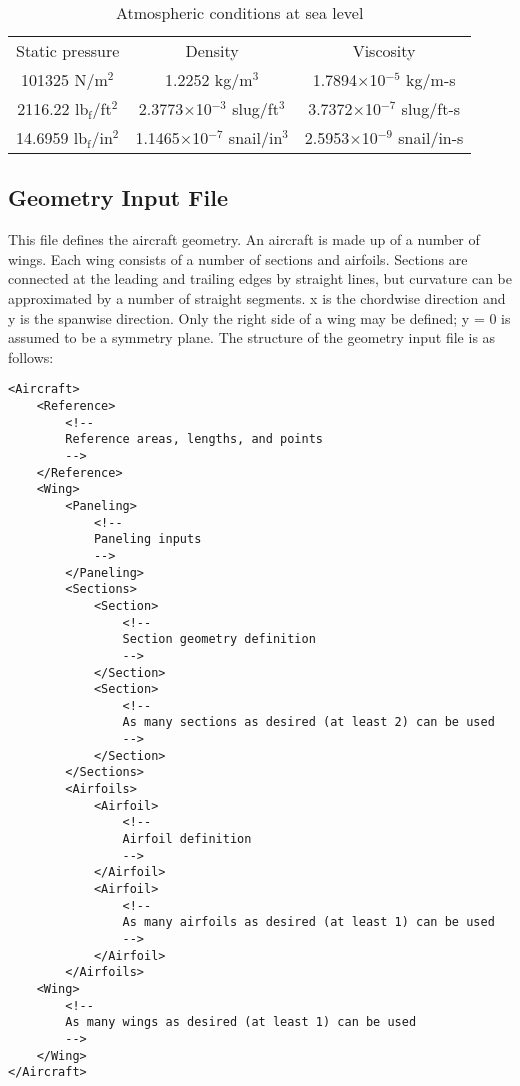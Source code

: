 \documentclass[11pt]{article}
\begin{document}
\begin{table}
\caption{Atmospheric conditions at sea level}
\centering
	\begin{tabular}{c c c} \hline \hline
	Static pressure                  & Density                          & Viscosity \\
	101325 N/m$^2$                   & 1.2252 kg/m$^3$                  & 1.7894$\times$10$^{-5}$ kg/m-s \\
	2116.22 lb$_\text{f}$/ft$^2$ & 2.3773$\times$10$^{-3}$ slug/ft$^3$  & 3.7372$\times$10$^{-7}$ slug/ft-s \\
	14.6959 lb$_\text{f}$/in$^2$ & 1.1465$\times$10$^{-7}$ snail/in$^3$ & 2.5953$\times$10$^{-9}$ snail/in-s
	\end{tabular}
\label{table:units}
\end{table}

\subsection{Geometry Input File}

This file defines the aircraft geometry. An aircraft is made up of a number of
wings. Each wing consists of a number of sections and airfoils. Sections are
connected at the leading and trailing edges by straight lines, but curvature
can be approximated by a number of straight segments. x is the chordwise
direction and y is the spanwise direction. Only the right side of a wing may
be defined; y = 0 is assumed to be a symmetry plane. The structure of the
geometry input file is as follows:
\begin{verbatim}
<Aircraft>
    <Reference>
        <!--
        Reference areas, lengths, and points
        -->
    </Reference>
    <Wing>
        <Paneling>
            <!--
            Paneling inputs
            -->
        </Paneling>
        <Sections>
            <Section>
                <!--
                Section geometry definition
                -->
            </Section>
            <Section>
                <!--
                As many sections as desired (at least 2) can be used
                -->
            </Section>
        </Sections>
        <Airfoils>
            <Airfoil>
                <!--
                Airfoil definition
                -->
            </Airfoil>
            <Airfoil>
                <!--
                As many airfoils as desired (at least 1) can be used
                -->
            </Airfoil>
        </Airfoils>
    <Wing>
        <!--
        As many wings as desired (at least 1) can be used
        -->
    </Wing>
</Aircraft>
\end{verbatim}
\end{document}
